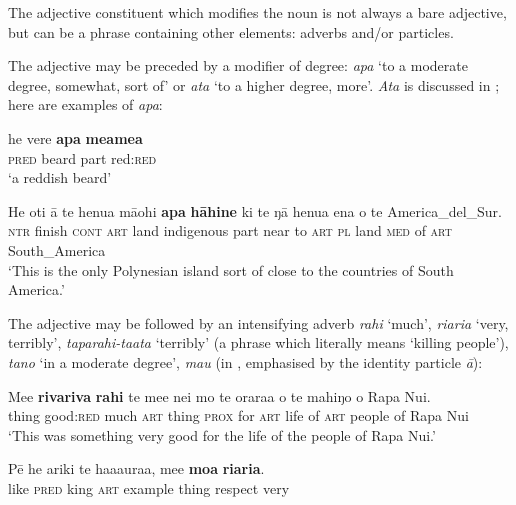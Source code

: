 The adjective constituent which modifies the noun is not always a bare adjective, but can be a phrase containing other elements: adverbs and/or particles.

The adjective may be preceded by a modifier of degree: \textit{{\ꞌ}apa} ‘to a moderate degree, somewhat, sort of’ or \textit{{\ꞌ}ata} ‘to a higher degree, more’. \textit{{\ꞌ}Ata} is discussed in ; here are examples of \textit{{\ꞌ}apa}:

\ea\label{ex:5.138}
\gll he vere \textbf{{\ꞌ}apa} \textbf{meamea} \\
\textsc{pred} beard part red:\textsc{red} \\

\glt 
‘a reddish beard’  
\z

\ea\label{ex:5.139}
\gll He oti {\ꞌ}ā te henua mā{\ꞌ}ohi \textbf{{\ꞌ}apa} \textbf{hāhine} ki te ŋā henua ena  o te America\_del\_Sur.\\
\textsc{ntr} finish \textsc{cont} \textsc{art} land indigenous part near to \textsc{art} \textsc{pl} land \textsc{med}  of \textsc{art} South\_America\\

\glt 
‘This is the only Polynesian island sort of close to the countries of South America.’ \textstyleExampleref{[R350.003]} 
\z

The adjective may be followed by an intensifying adverb \textit{rahi} ‘much’, \textit{\mbox{ri{\ꞌ}ari{\ꞌ}a}} ‘very, terribly’, \textit{taparahi-ta{\ꞌ}ata} ‘terribly’ (a  phrase which literally means ‘killing people’), \textit{tano} ‘in a moderate degree’, \textit{mau} (in , emphasised by the identity particle \textit{{\ꞌ}ā}):

\ea\label{ex:5.140}
\gll Me{\ꞌ}e \textbf{rivariva} \textbf{rahi} te me{\ꞌ}e nei mo te orara{\ꞌ}a o te mahiŋo o Rapa Nui. \\
thing good:\textsc{red} much \textsc{art} thing \textsc{prox} for \textsc{art} life of \textsc{art} people of Rapa Nui \\

\glt 
‘This was something very good for the life of the people of Rapa Nui.’ \textstyleExampleref{[R231.314]} 
\z

\ea\label{ex:5.141}
\gll Pē he {\ꞌ}ariki te ha{\ꞌ}aaura{\ꞌ}a, me{\ꞌ}e \textbf{mo{\ꞌ}a} \textbf{ri{\ꞌ}ari{\ꞌ}a}. \\
like \textsc{pred} king \textsc{art} example thing respect very \\

